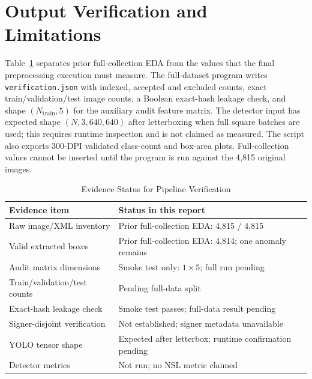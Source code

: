 \documentclass[conference]{IEEEtran}
\begin{document}
\section{Output Verification and Limitations}
Table~\ref{tab:verify} separates prior full-collection EDA from the values that the final preprocessing execution must measure. The full-dataset program writes \texttt{verification.json} with indexed, accepted and excluded counts, exact train/validation/test image counts, a Boolean exact-hash leakage check, and shape $(N_{\mathrm{train}},5)$ for the auxiliary audit feature matrix. The detector input has expected shape $(N,3,640,640)$ after letterboxing when full square batches are used; this requires runtime inspection and is not claimed as measured. The script also exports 300-DPI validated class-count and box-area plots. Full-collection values cannot be inserted until the program is run against the 4,815 original images.
\begin{table}[t]
\caption{Evidence Status for Pipeline Verification}\label{tab:verify}
\centering\footnotesize
\begin{tabular}{p{}p{}}
\toprule
Evidence item & Status in this report\\\midrule
Raw image/XML inventory & Prior full-collection EDA: 4,815 / 4,815\\
Valid extracted boxes & Prior full-collection EDA: 4,814; one anomaly remains\\
Audit matrix dimensions & Smoke test only: $1\times5$; full run pending\\
Train/validation/test counts & Pending full-data split\\
Exact-hash leakage check & Smoke test passes; full-data result pending\\
Signer-disjoint verification & Not established; signer metadata unavailable\\
YOLO tensor shape & Expected after letterbox; runtime confirmation pending\\
Detector metrics & Not run; no NSL metric claimed\\
\bottomrule
\end{tabular}
\end{table}
\end{document}
